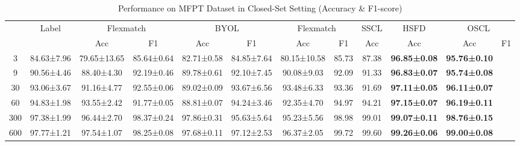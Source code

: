 \documentclass[journal]{IEEEtran}
\begin{document}
\begin{table}[!t]
\centering
\caption{Performance on MFPT Dataset in Closed-Set Setting (Accuracy \& F1-score)}
\label{tab:mfpt_closed_set}
\small
\setlength{\tabcolsep}{2.2pt}
\begin{tabular}{@{\hspace{2pt}}c|c|cc|cc|cc|c|c|cc@{\hspace{2pt}}}
  \toprule
  & Label & \multicolumn{2}{c}{Flexmatch} & \multicolumn{2}{c}{BYOL} & 
  \multicolumn{2}{c}{Flexmatch} & \multicolumn{1}{c}{SSCL} & 
  \multicolumn{1}{c}{HSFD} & \multicolumn{2}{c}{OSCL} \\
  \cmidrule{3-12}
  & & Acc & F1 & Acc & F1 & Acc & F1 & Acc & Acc & Acc & F1 \\
  \midrule
  3    & 84.63±7.96   & 79.65±13.65  & 85.64±0.64  & 82.71±0.58  & 84.85±7.64  & 80.15±10.58 & 85.73  & 87.38  & \textbf{96.85±0.08}  & \textbf{95.76±0.10} \\
  9    & 90.56±4.46   & 88.40±4.30   & 92.19±0.46  & 89.78±0.61  & 92.10±7.45  & 90.08±9.03  & 92.09  & 91.33  & \textbf{96.83±0.07}  & \textbf{95.74±0.08} \\
  30   & 93.06±3.67   & 91.16±4.77   & 92.55±0.06  & 89.02±0.09  & 93.67±6.56  & 93.48±6.33  & 93.36  & 91.69  & \textbf{97.11±0.05}  & \textbf{96.11±0.07} \\
  60   & 94.83±1.98   & 93.55±2.42   & 91.77±0.05  & 88.81±0.07  & 94.24±3.46  & 92.35±4.70  & 94.97  & 94.21  & \textbf{97.15±0.07}  & \textbf{96.19±0.11} \\
  300  & 97.38±1.99   & 96.44±2.70   & 98.37±0.24  & 97.86±0.31  & 95.63±5.64  & 95.23±5.56  & 98.98  & 99.01  & \textbf{99.07±0.11}  & \textbf{98.76±0.15} \\
  600  & 97.77±1.21   & 97.54±1.07   & 98.25±0.08  & 97.68±0.11  & 97.12±2.53  & 96.37±2.05  & 99.72  & 99.60  & \textbf{99.26±0.06}  & \textbf{99.00±0.08} \\
  \bottomrule
\end{tabular}
\end{table}
\end{document}
